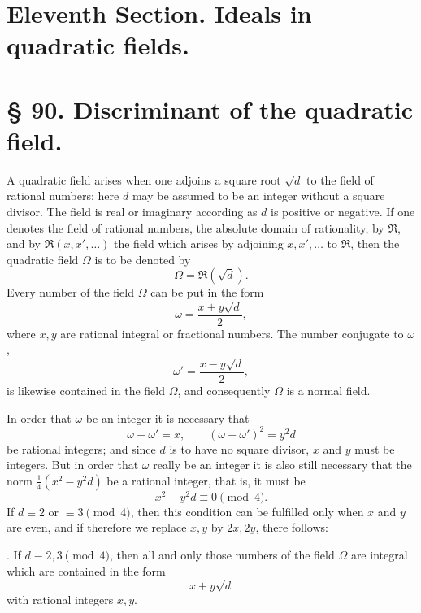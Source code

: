 \documentclass[11pt]{article}
\begin{document}
\section*{Eleventh Section. Ideals in quadratic fields.}

\section*{§ 90. Discriminant of the quadratic field.}

A quadratic field arises when one adjoins a square root $\sqrt d$ to the field of rational numbers; here $d$ may be assumed to be an integer without a square divisor. The field is real or imaginary according as $d$ is positive or negative. If one denotes the field of rational numbers, the absolute domain of rationality, by $\mathfrak R$, and by $\mathfrak R(x,x',\ldots)$ the field which arises by adjoining $x,x',\ldots$ to $\mathfrak R$, then the quadratic field $\Omega$ is to be denoted by
\begin{equation}
 \Omega=\mathfrak R(\sqrt d).
\tag{1}
\end{equation}
Every number of the field $\Omega$ can be put in the form
\begin{equation}
 \omega=\frac{x+y\sqrt d}{2},
\tag{2}
\end{equation}
where $x,y$ are rational integral or fractional numbers. The number conjugate to $\omega$,
\begin{equation}
 \omega'=\frac{x-y\sqrt d}{2},
\tag{3}
\end{equation}
is likewise contained in the field $\Omega$, and consequently $\Omega$ is a normal field.

In order that $\omega$ be an integer it is necessary that
\[
 \omega+\omega'=x,
 \qquad (\omega-\omega')^2=y^2d
\]
be rational integers; and since $d$ is to have no square divisor, $x$ and $y$ must be integers. But in order that $\omega$ really be an integer it is also still necessary that the norm $\frac14(x^2-y^2d)$ be a rational integer, that is, it must be
\begin{equation}
 x^2-y^2d\equiv0\pmod4 .
\tag{4}
\end{equation}
If $d\equiv2$ or $\equiv3\pmod4$, then this condition can be fulfilled only when $x$ and $y$ are even, and if therefore we replace $x,y$ by $2x,2y$, there follows:

\medskip
{}. If $d\equiv2,3\pmod4$, then all and only those numbers of the field $\Omega$ are integral which are contained in the form
\[
 x+y\sqrt d
\]
with rational integers $x,y$.
\medskip
\end{document}
